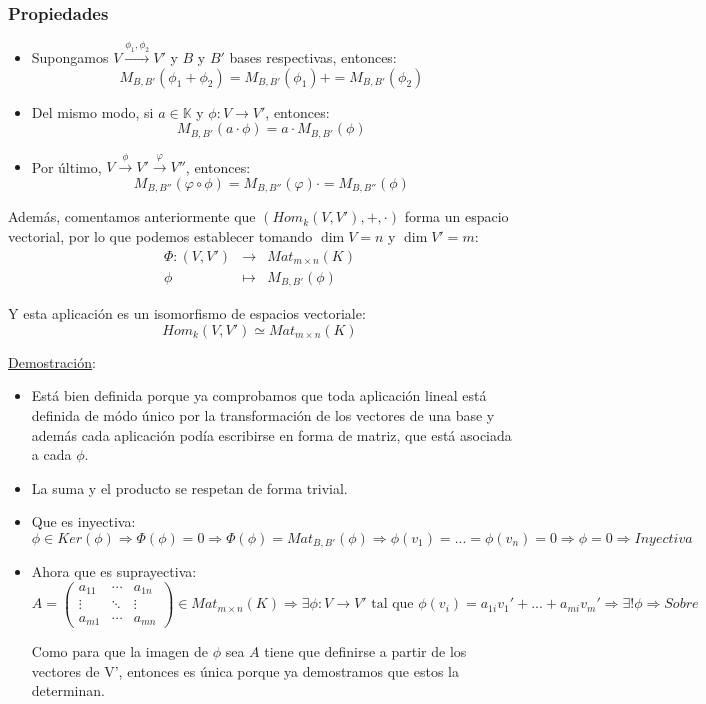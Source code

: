 \documentclass[10pt,a4paper,openright]{book}
\begin{document}
\subsubsection*{Propiedades}
\begin{itemize}
\item Supongamos $V\stackrel{\phi_1, \phi_2}{\longrightarrow} V'$ y $B$ y $B'$ bases respectivas, entonces:
$$M_{B,B'}(\phi_1+\phi_2)=M_{B,B'}(\phi_1)+=M_{B,B'}(\phi_2)$$

\item Del mismo modo, si $a\in \mathbb K$ y $\phi: V\longrightarrow V'$, entonces:
$$M_{B,B'}(a\cdot \phi)=a \cdot M_{B,B'}(\phi)$$

\item Por último, $V\stackrel{\phi}{\longrightarrow} V'\stackrel{\varphi}{\longrightarrow } V''$, entonces:
$$M_{B,B''}(\varphi\circ \phi)=M_{B,B''}(\varphi)\cdot =M_{B,B''}(\phi)$$
\end{itemize}

Además, comentamos anteriormente que $(Hom_k(V,V'), +, \cdot )$ forma un espacio vectorial, por lo que podemos establecer tomando $\dim V=n$ y $\dim V'=m$:
\begin{eqnarray*} \Phi:(V,V') &\longrightarrow& Mat_{m\times n}(K)\\ \phi &\longmapsto& M_{B,B'}(\phi) 
\end{eqnarray*} 

Y esta aplicación es un isomorfismo de espacios vectoriale:
$$Hom_k(V,V')\simeq Mat_{m\times n}(K)$$

\underline{Demostración}:
\begin{itemize}
\item Está bien definida porque ya comprobamos que toda aplicación lineal está definida de módo único por la transformación de los vectores de una base y además cada aplicación podía escribirse en forma de matriz, que está asociada a cada $\phi$.

\item La suma y el producto se respetan de forma trivial.

\item Que es inyectiva:
$$\phi\in Ker(\phi)\Rightarrow \Phi(\phi)=0\Rightarrow \Phi(\phi)=Mat_{B,B'}(\phi)\Rightarrow \phi(v_1)=...=\phi(v_n)=0\Rightarrow \phi=0\Rightarrow Inyectiva$$

\item Ahora que es suprayectiva:
$$A=\begin{pmatrix}
a_{11} & \cdots & a_{1n} \\ \vdots & \ddots & \vdots \\ a_{m1} & \cdots & a_{mn}\end{pmatrix}\in Mat_{m\times n}(K)\Rightarrow \exists \phi: V\longrightarrow V'\mbox{ tal que }\phi(v_i)=a_{1i}v_1'+...+a_{mi}v_m'\Rightarrow \exists!\phi\Rightarrow Sobre$$

Como para que la imagen de $\phi$ sea $A$ tiene que definirse a partir de los vectores de V', entonces es única porque ya demostramos que estos la determinan.
\end{itemize}
\end{document}
